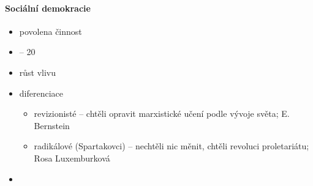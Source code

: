 \paragraph{Sociální demokracie}
\begin{itemize}
\item povolena činnost
\item {} -- 20%
\item růst vlivu
\item diferenciace	
	\begin{itemize}
	\item revizionisté -- chtěli opravit marxistické učení podle vývoje světa; E. Bernstein
	\item radikálové (Spartakovci) -- nechtěli nic měnit, chtěli revoluci proletariátu; Rosa Luxemburková
	\end{itemize}
\item {}
\end{itemize}

\newpage
\timeline

